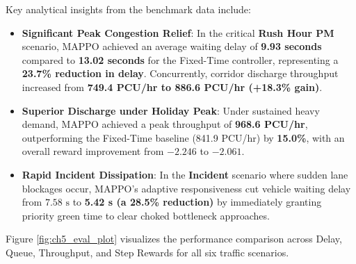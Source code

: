 \documentclass[12pt,a4paper,oneside]{report}
\begin{document}
Key analytical insights from the benchmark data include:
\begin{itemize}
    \item \textbf{Significant Peak Congestion Relief}: In the critical \textbf{Rush Hour PM} scenario, MAPPO achieved an average waiting delay of \textbf{9.93 seconds} compared to \textbf{13.02 seconds} for the Fixed-Time controller, representing a \textbf{23.7\% reduction in delay}. Concurrently, corridor discharge throughput increased from \textbf{749.4 PCU/hr to 886.6 PCU/hr (+18.3\% gain)}.
    \item \textbf{Superior Discharge under Holiday Peak}: Under sustained heavy demand, MAPPO achieved a peak throughput of \textbf{968.6 PCU/hr}, outperforming the Fixed-Time baseline (841.9 PCU/hr) by \textbf{15.0\%}, with an overall reward improvement from $-2.246$ to $-2.061$.
    \item \textbf{Rapid Incident Dissipation}: In the \textbf{Incident} scenario where sudden lane blockages occur, MAPPO's adaptive responsiveness cut vehicle waiting delay from $7.58\text{ s}$ to \textbf{5.42 s (a 28.5\% reduction)} by immediately granting priority green time to clear choked bottleneck approaches.
\end{itemize}

Figure \ref{fig:ch5_eval_plot} visualizes the performance comparison across Delay, Queue, Throughput, and Step Rewards for all six traffic scenarios.
\end{document}
